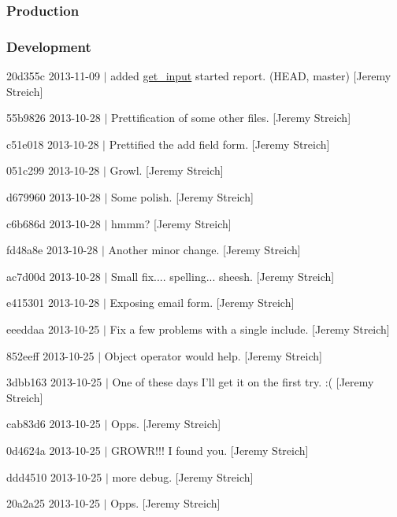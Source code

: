 \subsubsection*{Production}

\subsubsection*{Development}


\begin{DoxyItemize}
\item 20d355c 2013-\/11-\/09 $|$ added \hyperlink{classget__input}{get\-\_\-input} started report. (H\-E\-A\-D, master) \mbox{[}Jeremy Streich\mbox{]}
\item 55b9826 2013-\/10-\/28 $|$ Prettification of some other files. \mbox{[}Jeremy Streich\mbox{]}
\item c51e018 2013-\/10-\/28 $|$ Prettified the add field form. \mbox{[}Jeremy Streich\mbox{]}
\item 051c299 2013-\/10-\/28 $|$ Growl. \mbox{[}Jeremy Streich\mbox{]}
\item d679960 2013-\/10-\/28 $|$ Some polish. \mbox{[}Jeremy Streich\mbox{]}
\item c6b686d 2013-\/10-\/28 $|$ hmmm? \mbox{[}Jeremy Streich\mbox{]}
\item fd48a8e 2013-\/10-\/28 $|$ Another minor change. \mbox{[}Jeremy Streich\mbox{]}
\item ac7d00d 2013-\/10-\/28 $|$ Small fix.... spelling... sheesh. \mbox{[}Jeremy Streich\mbox{]}
\item e415301 2013-\/10-\/28 $|$ Exposing email form. \mbox{[}Jeremy Streich\mbox{]}
\item eeeddaa 2013-\/10-\/25 $|$ Fix a few problems with a single include. \mbox{[}Jeremy Streich\mbox{]}
\item 852eeff 2013-\/10-\/25 $|$ Object operator would help. \mbox{[}Jeremy Streich\mbox{]}
\item 3dbb163 2013-\/10-\/25 $|$ One of these days I'll get it on the first try. \-:( \mbox{[}Jeremy Streich\mbox{]}
\item cab83d6 2013-\/10-\/25 $|$ Opps. \mbox{[}Jeremy Streich\mbox{]}
\item 0d4624a 2013-\/10-\/25 $|$ G\-R\-O\-W\-R!!! I found you. \mbox{[}Jeremy Streich\mbox{]}
\item ddd4510 2013-\/10-\/25 $|$ more debug. \mbox{[}Jeremy Streich\mbox{]}
\item 20a2a25 2013-\/10-\/25 $|$ Opps. \mbox{[}Jeremy Streich\mbox{]}

\end{DoxyItemize}
